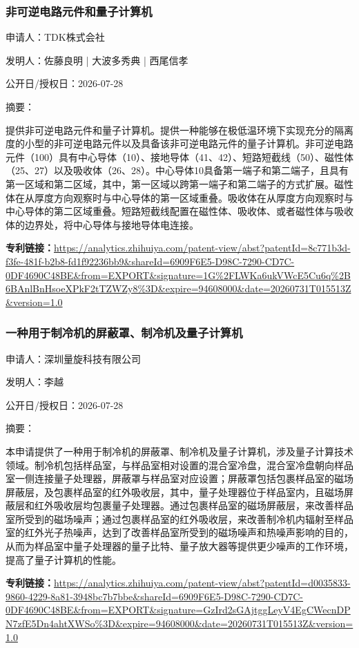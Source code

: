 \documentclass[12pt,a4paper]{ctexart}
\begin{document}
\subsubsection{ 非可逆电路元件和量子计算机 }

申请人：TDK株式会社

发明人：佐藤良明 | 大波多秀典 | 西尾信孝

公开日/授权日：2026-07-28

摘要：

提供非可逆电路元件和量子计算机。提供一种能够在极低温环境下实现充分的隔离度的小型的非可逆电路元件以及具备该非可逆电路元件的量子计算机。非可逆电路元件（100）具有中心导体（10）、接地导体（41、42）、短路短截线（50）、磁性体（25、27）以及吸收体（26、28）。中心导体10具备第一端子和第二端子，且具有第一区域和第二区域，其中，第一区域以跨第一端子和第二端子的方式扩展。磁性体在从厚度方向观察时与中心导体的第一区域重叠。吸收体在从厚度方向观察时与中心导体的第二区域重叠。短路短截线配置在磁性体、吸收体、或者磁性体与吸收体的边界处，将中心导体与接地导体电连接。

\noindent\textbf{专利链接：}\url{https://analytics.zhihuiya.com/patent-view/abst?patentId=8c771b3d-f3fe-481f-b2b8-fd1f92236bb9&shareId=6909F6E5-D98C-7290-CD7C-0DF4690C48BE&from=EXPORT&signature=1G%2FLWKa6ukVWcE5Cu6q%2B6BAnlBnHsoeXPkF2tTZWZy8%3D&expire=94608000&date=20260731T015513Z&version=1.0}

\subsubsection{ 一种用于制冷机的屏蔽罩、制冷机及量子计算机 }

申请人：深圳量旋科技有限公司

发明人：李越

公开日/授权日：2026-07-28

摘要：

本申请提供了一种用于制冷机的屏蔽罩、制冷机及量子计算机，涉及量子计算技术领域。制冷机包括样品室，与样品室相对设置的混合室冷盘，混合室冷盘朝向样品室一侧连接量子处理器，屏蔽罩与样品室对应设置；屏蔽罩包括包裹样品室的磁场屏蔽层，及包裹样品室的红外吸收层，其中，量子处理器位于样品室内，且磁场屏蔽层和红外吸收层均包裹量子处理器。通过包裹样品室的磁场屏蔽层，来改善样品室所受到的磁场噪声；通过包裹样品室的红外吸收层，来改善制冷机内辐射至样品室的红外光子热噪声，达到了改善样品室所受到的磁场噪声和热噪声影响的目的，从而为样品室中量子处理器的量子比特、量子放大器等提供更少噪声的工作环境，提高了量子计算机的性能。

\noindent\textbf{专利链接：}\url{https://analytics.zhihuiya.com/patent-view/abst?patentId=d0035833-9860-4229-8a81-3948bc7b7bbe&shareId=6909F6E5-D98C-7290-CD7C-0DF4690C48BE&from=EXPORT&signature=GzIrd2sGAjtggLeyV4EgCWecnDPN7zfE5Dn4ahtXWSo%3D&expire=94608000&date=20260731T015513Z&version=1.0}
\end{document}
